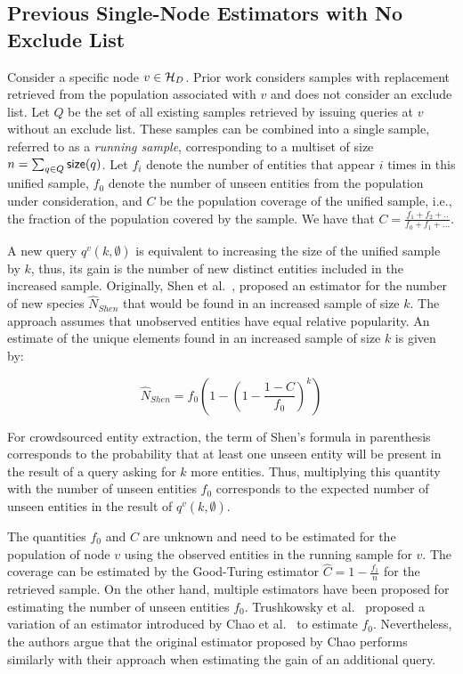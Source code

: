 \subsection{Previous Single-Node Estimators with No Exclude List}
\label{sec:prevest}
Consider a specific node $v \in \mathcal{H}_D$. Prior work considers samples with replacement retrieved from the population associated with $v$ and does not consider an exclude list. Let $Q$ be the set of all existing samples retrieved by issuing queries at $v$ without an exclude list. These samples can be combined into a single sample, referred to as a {\em running sample}, corresponding to a multiset of size $n = \sum_{q \in Q} {\sf size}(q)$. Let $f_i$ denote the number of entities that appear $i$ times in this unified sample, $f_0$ denote the number of unseen entities from the population under consideration, and $C$ be the population coverage of the unified sample, i.e., the fraction of the population covered by the sample. We have that $C = \frac{f_1 + f_2 + ..}{f_0 + f_1 + ...}$.

A new query $q^v(k,\emptyset)$ is equivalent to increasing the size of the unified sample by $k$, thus, its gain is the number of new distinct entities included in the increased sample. Originally, Shen et al.~\cite{shen:2003}, proposed an estimator for the number of new species $\hat{N}_{Shen}$ that would be found in an increased sample of size $k$. The approach assumes that unobserved entities have equal relative popularity. An estimate of the unique elements found in an increased sample of size $k$ is given by:

{\small \begin{equation}
\label{eq:shen}
\hat{N}_{Shen} = f_0\left( 1 - \left(1 - \frac{1 - C}{f_0}\right)^k\right)
\end{equation}}

For crowdsourced entity extraction, the term of Shen's formula in parenthesis corresponds to the probability that at least one unseen entity will be present in the result of a query asking for $k$ more entities. Thus, multiplying this quantity with the number of unseen entities $f_0$ corresponds to the expected number of unseen entities in the result of $q^v(k,\emptyset)$.

The quantities $f_0$ and $C$ are unknown and need to be estimated for the population of node $v$ using the observed entities in the running sample for $v$. The coverage can be estimated by the Good-Turing estimator $\hat{C} = 1 - \frac{f_1}{n}$ for the retrieved sample. On the other hand, multiple estimators have been proposed for estimating the number of unseen entities $f_0$. Trushkowsky et al.~\cite{trushkowsky:2013} proposed a variation of an estimator introduced by Chao et al.~\cite{chao:1992} to estimate $f_0$. Nevertheless, the authors argue that the original estimator proposed by Chao performs similarly with their approach when estimating the gain of an additional query. 

